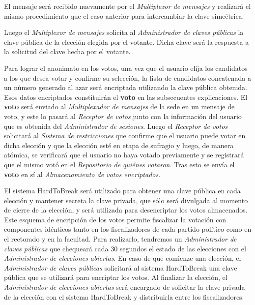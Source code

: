 El mensaje será recibido nuevamente por el \emph{Multiplexor de mensajes} y realizar\'a el mismo procedimiento que el caso anterior para intercambiar la clave sime\'etrica.

Luego el \emph{Multiplexor de mensajes} solicita al \emph{Administrador de claves p\'ublicas} la clave p\'ublica de la elecci\'on elegida por el votante. Dicha clave ser\'a la respuesta a la solicitud del clave hecha por el votante.

Para lograr el anonimato en los votos, una vez que el usuario elija los candidatos a los que desea votar y confirme su selección, la lista de candidatos concatenada a un número generado al azar será encriptada utilizando la clave pública obtenida. 
Esos datos encriptados constituirán el {\bf voto} en las subsecuentes explicaciones. 
El {\bf voto} será enviado al \emph{Multiplexador de mensajes} de la sede en un mensaje de voto, y este lo pasar\'a al \emph{Receptor de votos} junto con la informaci\'on del usuario que es obtenida del \emph{Administrador de sesiones}. 
Luego el \emph{Receptor de votos} solicitará al \emph{Sistema de restricciones} que confirme que el usuario puede votar en dicha elección y que la elección esté en etapa de sufragio y luego, de manera atómica, se verificará que el usuario no haya votado previamente y se registrará que el mismo votó en el \emph{Repositorio de quiénes votaron}. Tras esto se envía el {\bf voto} en sí al \emph{Almacenamiento de votos encriptados}.

El sistema HardToBreak será utilizado para obtener una clave pública en cada elección y mantener secreta la clave privada, que sólo será divulgada al momento de cierre de la elección, y será utilizada para desencriptar los votos almacenados. 
Este esquema de encripción de los votos permite fiscalizar la votación con componentes idénticos tanto en los fiscalizadores de cada partido pol\'itico como en el rectorado y en la facultad. Para realizarlo, tendremos un \emph{Administrador de claves p\'ublicas} que chequear\'a cada 30 segundos el estado de las elecciones con el \emph{Administrador de elecciones abiertas}. En caso de que comienze una elecci\'on, el \emph{Administrador de claves p\'ublicas} solicitar\'a al sistema HardToBreak una clave p\'ublica que se utilizar\'a para encriptar los votos. Al finalizar la elecci\'on, el \emph{Administrador de elecciones abiertas} ser\'a encargado de solicitar la clave privada de la elecci\'on con el sistema HardToBreak y distribuirla entre los fiscalizadores.



